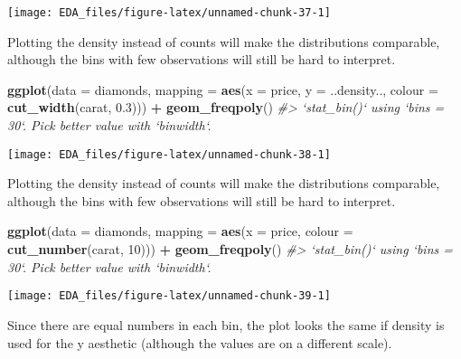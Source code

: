 \documentclass[]{book}
\newenvironment{Shaded}{\begin{snugshade}}{\end{snugshade}}
\newcommand{\CommentTok}[1]{\textcolor[rgb]{0.56,0.35,0.01}{\textit{#1}}}
\newcommand{\DataTypeTok}[1]{\textcolor[rgb]{0.13,0.29,0.53}{#1}}
\newcommand{\DecValTok}[1]{\textcolor[rgb]{0.00,0.00,0.81}{#1}}
\newcommand{\FloatTok}[1]{\textcolor[rgb]{0.00,0.00,0.81}{#1}}
\newcommand{\KeywordTok}[1]{\textcolor[rgb]{0.13,0.29,0.53}{\textbf{#1}}}
\newcommand{\NormalTok}[1]{#1}
\newcommand{\OperatorTok}[1]{\textcolor[rgb]{0.81,0.36,0.00}{\textbf{#1}}}
\newcommand{\StringTok}[1]{\textcolor[rgb]{0.31,0.60,0.02}{#1}}
\theoremstyle{plain}
\theoremstyle{remark}
\theoremstyle{definition}
\theoremstyle{definition}
\theoremstyle{definition}
\theoremstyle{remark}
\begin{document}
\begin{center}\texttt{[image: EDA\_files/figure-latex/unnamed-chunk-37-1]} \end{center}

Plotting the density instead of counts will make the distributions
comparable, although the bins with few observations will still be hard
to interpret.

\begin{Shaded}
\begin{Highlighting}[]
\KeywordTok{ggplot}\NormalTok{(}\DataTypeTok{data =}\NormalTok{ diamonds,}
       \DataTypeTok{mapping =} \KeywordTok{aes}\NormalTok{(}\DataTypeTok{x =}\NormalTok{ price,}
                     \DataTypeTok{y =}\NormalTok{ ..density..,}
                     \DataTypeTok{colour =} \KeywordTok{cut_width}\NormalTok{(carat, }\FloatTok{0.3}\NormalTok{))) }\OperatorTok{+}
\StringTok{  }\KeywordTok{geom_freqpoly}\NormalTok{()}
\CommentTok{#> `stat_bin()` using `bins = 30`. Pick better value with `binwidth`.}
\end{Highlighting}
\end{Shaded}

\begin{center}\texttt{[image: EDA\_files/figure-latex/unnamed-chunk-38-1]} \end{center}

Plotting the density instead of counts will make the distributions
comparable, although the bins with few observations will still be hard
to interpret.

\begin{Shaded}
\begin{Highlighting}[]
\KeywordTok{ggplot}\NormalTok{(}\DataTypeTok{data =}\NormalTok{ diamonds,}
       \DataTypeTok{mapping =} \KeywordTok{aes}\NormalTok{(}\DataTypeTok{x =}\NormalTok{ price,}
                     \DataTypeTok{colour =} \KeywordTok{cut_number}\NormalTok{(carat, }\DecValTok{10}\NormalTok{))) }\OperatorTok{+}
\StringTok{  }\KeywordTok{geom_freqpoly}\NormalTok{()}
\CommentTok{#> `stat_bin()` using `bins = 30`. Pick better value with `binwidth`.}
\end{Highlighting}
\end{Shaded}

\begin{center}\texttt{[image: EDA\_files/figure-latex/unnamed-chunk-39-1]} \end{center}

Since there are equal numbers in each bin, the plot looks the same if
density is used for the y aesthetic (although the values are on a
different scale).
\end{document}
